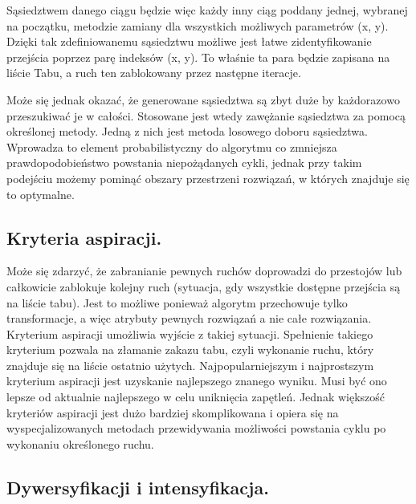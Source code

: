 Sąsiedztwem danego ciągu będzie więc każdy inny ciąg poddany jednej, wybranej na początku, metodzie zamiany dla wszystkich możliwych parametrów (x, y). Dzięki tak zdefiniowanemu sąsiedztwu możliwe jest łatwe zidentyfikowanie przejścia poprzez parę indeksów (x, y). To właśnie ta para będzie zapisana na liście Tabu, a ruch ten zablokowany przez następne iteracje.

Może się jednak okazać, że generowane sąsiedztwa są zbyt duże by każdorazowo przeszukiwać je w całości. Stosowane jest wtedy zawężanie sąsiedztwa za pomocą określonej metody. Jedną z nich jest metoda losowego doboru sąsiedztwa. Wprowadza to element probabilistyczny do algorytmu co zmniejsza prawdopodobieństwo powstania niepożądanych cykli, jednak przy takim podejściu możemy pominąć obszary przestrzeni rozwiązań, w których znajduje się to optymalne.

\subsection{Kryteria aspiracji.}

Może się zdarzyć, że zabranianie pewnych ruchów doprowadzi do przestojów lub całkowicie zablokuje kolejny ruch (sytuacja, gdy wszystkie dostępne przejścia są na liście tabu). Jest to możliwe ponieważ algorytm przechowuje tylko transformacje, a więc atrybuty pewnych rozwiązań a nie całe rozwiązania. Kryterium aspiracji umożliwia wyjście z takiej sytuacji.
Spełnienie takiego kryterium  pozwala na złamanie zakazu tabu, czyli wykonanie ruchu, który znajduje się na liście ostatnio użytych. Najpopularniejszym i najprostszym kryterium aspiracji jest uzyskanie najlepszego znanego wyniku. Musi być ono lepsze od aktualnie najlepszego w celu uniknięcia zapętleń. Jednak większość kryteriów aspiracji jest dużo bardziej skomplikowana i opiera się na wyspecjalizowanych metodach przewidywania możliwości powstania cyklu po wykonaniu określonego ruchu.

\subsection{Dywersyfikacji i intensyfikacja.}

